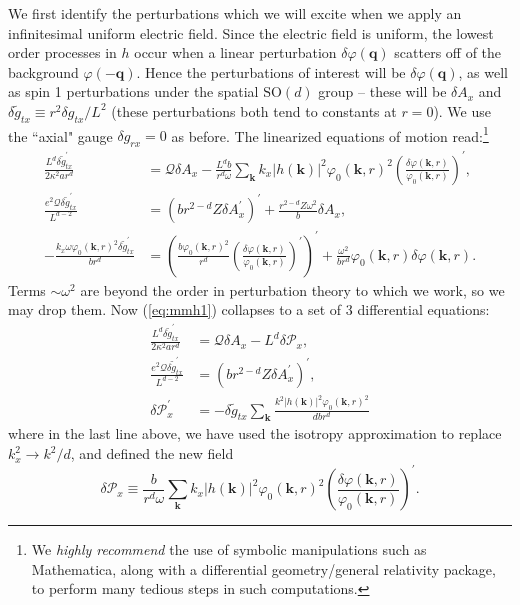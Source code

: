 \documentclass[10pt, oneside]{book}
\begin{document}
\begin{doublespace}
We first identify the perturbations which we will excite when we apply an infinitesimal uniform electric field.   Since the electric field is uniform, the lowest order processes in $h$ occur when a linear perturbation $\delta\varphi(\mathbf{q})$ scatters off of the background $\varphi(-\mathbf{q})$.     Hence the perturbations of interest will be $\delta \varphi(\mathbf{q})$, as well as spin 1 perturbations under the spatial $\mathrm{SO}(d)$ group -- these will be $\delta A_x$ and $\delta \tilde{g}_{tx} \equiv r^2 \delta g_{tx}/L^2$  (these perturbations both tend to constants at $r=0$).   We use the ``axial" gauge $\delta g_{rx}=0$ as before.    The linearized equations of motion read:\footnote{We \emph{highly recommend} the use of symbolic manipulations such as Mathematica, along with a differential geometry/general relativity package, to perform many tedious steps in such computations.} \begin{subequations}\label{eq:mmh1}\begin{align}
\frac{L^d \delta \tilde{g}_{tx}^\prime}{2\kappa^2 ar^d} &= \mathcal{Q}\delta A_x - \frac{L^d b}{r^d\omega} \sum_{\mathbf{k}} k_x |h(\mathbf{k})|^2 \varphi_0(\mathbf{k},r)^2 \left(\frac{\delta\varphi(\mathbf{k},r)}{\varphi_0(\mathbf{k},r)}\right)^\prime, \\
\frac{e^2\mathcal{Q} \delta \tilde{g}_{tx}^\prime}{L^{d-2}}&= \left(br^{2-d}Z\delta A_x^\prime\right)^\prime + \frac{r^{2-d}Z\omega^2}{b}\delta A_x, \\
-\frac{k_x\omega \varphi_0(\mathbf{k},r)^2\delta \tilde{g}_{tx}^\prime}{br^d} &= \left(\frac{b\varphi_0(\mathbf{k},r)^2}{r^d} \left(\frac{\delta \varphi(\mathbf{k},r)}{\varphi_0(\mathbf{k},r)}\right)^\prime\right)^\prime + \frac{\omega^2}{br^d} \varphi_0(\mathbf{k},r)\delta\varphi(\mathbf{k},r). 
\end{align}\end{subequations}
Terms $\sim \omega^2$ are beyond the order in perturbation theory to which we work, so we may drop them.   Now (\ref{eq:mmh1}) collapses to a set of 3 differential equations: \begin{subequations}\label{eq:mmh2}\begin{align}
\frac{L^d \delta \tilde{g}_{tx}^\prime}{2\kappa^2 ar^d} &= \mathcal{Q}\delta A_x - L^d \delta\mathcal{P}_x, \label{eq:mmh2a} \\
\frac{e^2\mathcal{Q} \delta \tilde{g}_{tx}^\prime}{L^{d-2}}&= \left(br^{2-d}Z\delta A_x^\prime\right)^\prime, \label{eq:mmh2b} \\
\delta \mathcal{P}_x^\prime &= -\delta \tilde{g}_{tx} \sum_{\mathbf{k}}\frac{k^2 |h(\mathbf{k})|^2 \varphi_0(\mathbf{k},r)^2}{dbr^d}  \label{eq:mmh2c}
\end{align}\end{subequations}where in the last line above, we have used the isotropy approximation to replace $k_x^2 \rightarrow k^2/d$, and defined the new field\begin{equation}
\delta \mathcal{P}_x \equiv \frac{b}{r^d\omega} \sum_{\mathbf{k}} k_x |h(\mathbf{k})|^2 \varphi_0(\mathbf{k},r)^2 \left(\frac{\delta \varphi(\mathbf{k},r)}{\varphi_0(\mathbf{k},r)}\right)^\prime.
\end{equation}


\end{doublespace}
\end{document}
